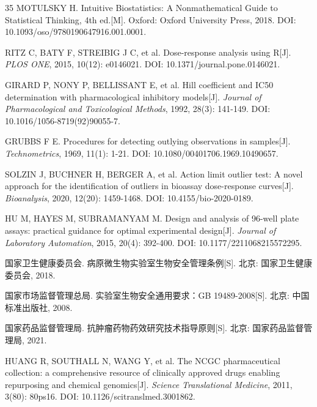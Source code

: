 \documentclass[12pt,a4paper]{article}
\begin{document}
{\begin{thebibliography}{35}
 MOTULSKY H. Intuitive Biostatistics: A Nonmathematical Guide to Statistical Thinking, 4th ed.[M]. Oxford: Oxford University Press, 2018. DOI: 10.1093/oso/9780190647916.001.0001.

 RITZ C, BATY F, STREIBIG J C, et al. Dose-response analysis using R[J]. \textit{PLOS ONE}, 2015, 10(12): e0146021. DOI: 10.1371/journal.pone.0146021.

 GIRARD P, NONY P, BELLISSANT E, et al. Hill coefficient and IC50 determination with pharmacological inhibitory models[J]. \textit{Journal of Pharmacological and Toxicological Methods}, 1992, 28(3): 141-149. DOI: 10.1016/1056-8719(92)90055-7.

 GRUBBS F E. Procedures for detecting outlying observations in samples[J]. \textit{Technometrics}, 1969, 11(1): 1-21. DOI: 10.1080/00401706.1969.10490657.

 SOLZIN J, BUCHNER H, BERGER A, et al. Action limit outlier test: A novel approach for the identification of outliers in bioassay dose-response curves[J]. \textit{Bioanalysis}, 2020, 12(20): 1459-1468. DOI: 10.4155/bio-2020-0189.

 HU M, HAYES M, SUBRAMANYAM M. Design and analysis of 96-well plate assays: practical guidance for optimal experimental design[J]. \textit{Journal of Laboratory Automation}, 2015, 20(4): 392-400. DOI: 10.1177/2211068215572295.

 国家卫生健康委员会. 病原微生物实验室生物安全管理条例[S]. 北京: 国家卫生健康委员会, 2018.

 国家市场监督管理总局. 实验室生物安全通用要求：GB 19489-2008[S]. 北京: 中国标准出版社, 2008.

 国家药品监督管理局. 抗肿瘤药物药效研究技术指导原则[S]. 北京: 国家药品监督管理局, 2021.

 HUANG R, SOUTHALL N, WANG Y, et al. The NCGC pharmaceutical collection: a comprehensive resource of clinically approved drugs enabling repurposing and chemical genomics[J]. \textit{Science Translational Medicine}, 2011, 3(80): 80ps16. DOI: 10.1126/scitranslmed.3001862.

\end{thebibliography}
}
\end{document}
